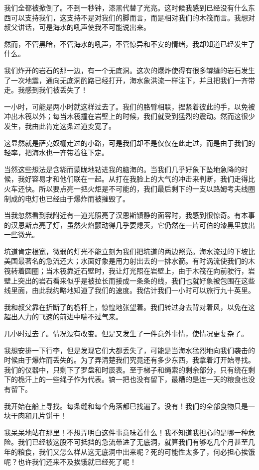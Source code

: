 \documentclass[10pt]{book}
\begin{document}
我们全都被掀倒了。不到一秒钟，漆黑代替了光亮。这时候我感到已经没有什么东西可以支持我们，这支持不是对我们的脚而言，而是相对我们的木筏而言。我想对叔父讲话，可是海水的吼声使我不可能说出来。

然而，不管黑暗，不管海水的吼声，不管惊异和不安的情绪，我却知道已经发生了什么。

我们炸开的岩石的那一边，有一个无底洞。这次的爆炸使得有很多罅缝的岩石发生了一次地震，通向无底洞酌路已经打开，海水象洪流一样注下，并且把我们一齐带走。我感到我们被丢失了！

一小时，可能是两小时就这样过去了。我们的胳臂相联，捏紧着彼此的手，以免被冲出木筏以外；每当木筏撞在岩壁上的时候，我们就受到猛烈的震动。然而这很少发生，我由此肯定这条过道变宽了。

这显然就是萨克奴栅走过的小路，可是我们却不是仅仅在此走过，而是由于我们的轻率，把海水也一齐带着往下定。

当然这些想法是含糊而蒙眬地钻进我的脑海的。当我们几乎好象下坠地急降的时候，我好容易才和他们联在一起。从打在我脸上的大气的冲击来判断，我们走得比火车还快。所以要点亮一把火炬是不可能的，我们最后剩下的一支以路姆考夫线圈制成的电灯也已经由于爆炸而被摧毁了。

当我忽然看到我附近有一道光照亮了汉恩斯镇静的面容时，我感到很惊奇。有本事的汉恩斯点亮了灯，虽然火焰颤动得几乎要熄灭，它仍然在一片可伯的漆黑里放出一些微光。

坑道肯定根宽，微弱的灯光不能立刻为我们把坑道的两边照亮。海水流过的下坡比美国最著名的急流还大；水面好象是用力射出去的一排水箭。有时涡流使我们的木筏转着圆圈；当木筏靠近石壁时，我让灯光照在岩壁上，由于木筏在向前驶行，岩壁上突出的岩石看来似乎是被拉长而接成一条条的线，我们也就好象被包围在这些线里面，由此我约略地知道了我们的速度。我估计我们一小时可以旅行九十英里。

我和叔父靠在折断了的桅杆上，惊惶地张望着。我们转过身去背对着风，以免在这超出人力的飞速的前进中喘不过气来。

几小时过去了。情况没有改变。但是又发生了一件意外事情，使情况更复杂了。

我想安排一下行李，但是发现它们大都丢失了，可能是当海水猛烈地向我们袭击的时候由于爆炸而丢失的。为了弄清楚我们究竟还有多少东西，我拿着灯开始寻找。我们的仪器中，只剩下了罗盘和时辰表。至于梯子和绳索的剩余部分，只有绕在剩下的桅汗上的一些绳子作为代表。镐一把也没有留下，最糟的是连一天的粮食也没有留下。

我开始在船上寻找。每条缝和每个角落都巳找遍了。没有！我们的全部食物只是一块干肉和几片饼干！

我呆呆地站在那里！不想弄明白这件事意味着什么！我不知道我担心的是哪一种危险。我们已经被这股不可抵挡的急流带进了无底洞，就算我们有够吃几个月甚至几年的粮食，我们又怎么样从这无底洞中出来呢？死的可能性太多了，何必担心挨饿呢？也许我们还来不及挨饿就已经死了呢！
\end{document}

